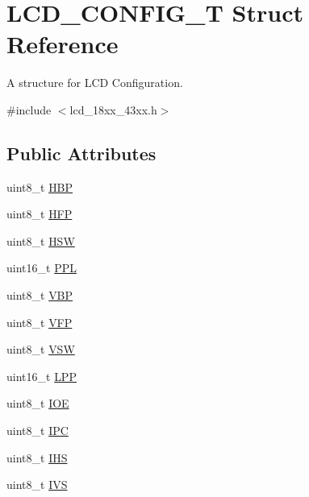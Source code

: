 \hypertarget{struct_l_c_d___c_o_n_f_i_g___t}{}\section{L\+C\+D\+\_\+\+C\+O\+N\+F\+I\+G\+\_\+T Struct Reference}
\label{struct_l_c_d___c_o_n_f_i_g___t}


A structure for L\+CD Configuration.  




{\ttfamily \#include $<$lcd\+\_\+18xx\+\_\+43xx.\+h$>$}

\subsection*{Public Attributes}
\begin{DoxyCompactItemize}
\item 
uint8\+\_\+t \hyperlink{struct_l_c_d___c_o_n_f_i_g___t_a2ed77ed1f73ff89f4fe1cfa889331223}{H\+BP}
\item 
uint8\+\_\+t \hyperlink{struct_l_c_d___c_o_n_f_i_g___t_a59cf68035de79f0a0961cd128dfbb900}{H\+FP}
\item 
uint8\+\_\+t \hyperlink{struct_l_c_d___c_o_n_f_i_g___t_a921d21f79b3a274f4b0cc3485becad9c}{H\+SW}
\item 
uint16\+\_\+t \hyperlink{struct_l_c_d___c_o_n_f_i_g___t_a62c1bec1fc5f9a154430135313d1210a}{P\+PL}
\item 
uint8\+\_\+t \hyperlink{struct_l_c_d___c_o_n_f_i_g___t_a5e464f7485cde1ffdbece953c8b56928}{V\+BP}
\item 
uint8\+\_\+t \hyperlink{struct_l_c_d___c_o_n_f_i_g___t_aa6fcb59e632f327ee91ed150035adcf7}{V\+FP}
\item 
uint8\+\_\+t \hyperlink{struct_l_c_d___c_o_n_f_i_g___t_aa1a2ded24df07c7f478d18b66bd3c2af}{V\+SW}
\item 
uint16\+\_\+t \hyperlink{struct_l_c_d___c_o_n_f_i_g___t_ad611d3e672a52a991bc54add20c2006d}{L\+PP}
\item 
uint8\+\_\+t \hyperlink{struct_l_c_d___c_o_n_f_i_g___t_a837e5568d9de4975bf1a17d2dc9756ba}{I\+OE}
\item 
uint8\+\_\+t \hyperlink{struct_l_c_d___c_o_n_f_i_g___t_a8e0103894c37b0d0cde5da401370dfd2}{I\+PC}
\item 
uint8\+\_\+t \hyperlink{struct_l_c_d___c_o_n_f_i_g___t_a390a03c8f78a0f1311e1ec77ed4dabc2}{I\+HS}
\item 
uint8\+\_\+t \hyperlink{struct_l_c_d___c_o_n_f_i_g___t_aff65ac9a723eca49368b5e3af4a74785}{I\+VS}

\end{DoxyCompactItemize}
